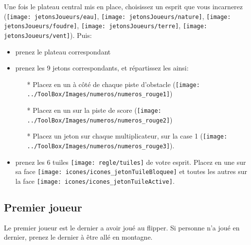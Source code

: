 Une fois le plateau central mis en place, choisissez un esprit que vous incarnerez (\texttt{[image: jetonsJoueurs/eau]}, \texttt{[image: jetonsJoueurs/nature]}, \texttt{[image: jetonsJoueurs/foudre]}, \texttt{[image: jetonsJoueurs/terre]}, \texttt{[image: jetonsJoueurs/vent]}). Puis:
\begin{itemize}
\item prenez le plateau correspondant
\item prenez les 9 jetons correspondants, et répartissez les ainsi:
\begin{itemize}
\item[*] Placez en un à côté de chaque piste d'obstacle (\texttt{[image: ../ToolBox/Images/numeros/numeros\_rouge1]})
\item[*] Placez en un sur la piste de score (\texttt{[image: ../ToolBox/Images/numeros/numeros\_rouge2]})
\item[*] Placez un jeton sur chaque multiplicateur, sur la case 1 (\texttt{[image: ../ToolBox/Images/numeros/numeros\_rouge3]}).
\end{itemize}
\item prenez les 6 tuiles \texttt{[image: regle/tuiles]} de votre esprit. Placez en une sur sa face \texttt{[image: icones/icones\_jetonTuileBloquee]} et toutes les autres sur la face \texttt{[image: icones/icones\_jetonTuileActive]}.
\end{itemize}
 
\subsection*{Premier joueur}
Le premier joueur est le dernier a avoir joué au flipper. Si personne n'a joué en dernier, prenez le dernier à être allé en montagne.